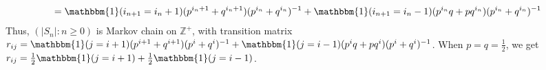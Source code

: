 \documentclass{ctexart}
\begin{document}
\begin{solution}
\begin{enumerate}
\[\begin{aligned}
          \\ &=\mathbbm{1}(i_{n + 1}=i_n +1)(p^{i_n + 1} +q^{i_n + 1})(p^{i_n} + q^{i_n})^{-1} + \mathbbm{1}(i_{n + 1}=i_n-1)(p^{i_n}q +pq^{i_n })(p^{i_n} + q^{i_n})^{-1}
        \end{aligned}
      \]
      Thus, \((|S_n|:n \geq 0)\) is Markov chain on \(\mathbb{Z}^+\), with transition matrix
      \(r_{ij}=\mathbbm{1}(j=i +1)(p^{i + 1} +q^{i + 1})(p^{i} + q^{i})^{-1} + \mathbbm{1}(j=i-1)(p^{i}q +pq^{i })(p^{i} + q^{i})^{-1}\).
      When \(p=q=\frac{1}{2}\), we get \(r_{ij}=\frac{1}{2}\mathbbm{1}(j=i+1) + \frac{1}{2}\mathbbm{1}(j=i - 1)\).
  \end{enumerate}

\end{solution}
\end{document}

